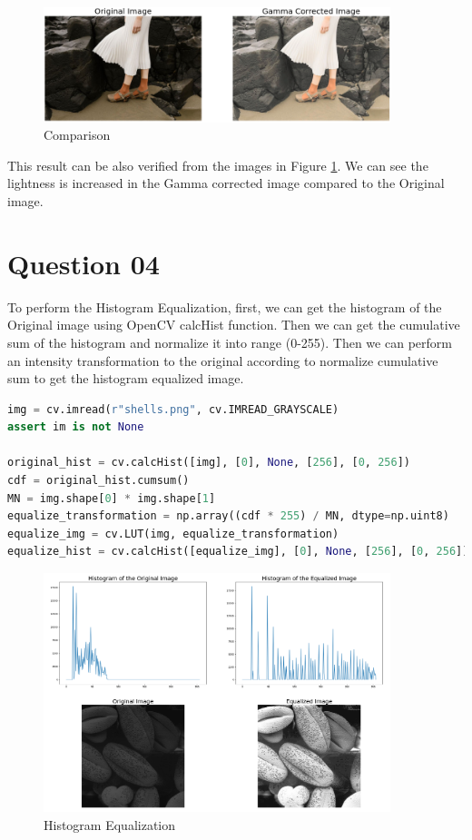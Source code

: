 \documentclass[a4paper]{article}
\begin{document}
\begin{figure}[!htb]
    \centering
    \includegraphics[width=0.9\textwidth]{../q32.png}

    \caption{Comparison}
    \label{figq32}
\end{figure}

This result can be also verified from the images in Figure \ref{figq32}.
 We can see the lightness is increased in the 
Gamma corrected image compared to the Original image.

\section*{Question 04}
To perform the Histogram Equalization, first, we can get the histogram of the
 Original image using OpenCV
calcHist function. Then we can get the cumulative sum of the histogram and
 normalize it into range (0-255). Then we can perform an intensity
  transformation to the original according to normalize cumulative sum to get the
  histogram equalized image.\\

\begin{lstlisting}[language=python, caption=Histogram Equalization]
img = cv.imread(r"shells.png", cv.IMREAD_GRAYSCALE)
assert im is not None

original_hist = cv.calcHist([img], [0], None, [256], [0, 256])
cdf = original_hist.cumsum()
MN = img.shape[0] * img.shape[1]
equalize_transformation = np.array((cdf * 255) / MN, dtype=np.uint8)
equalize_img = cv.LUT(img, equalize_transformation)
equalize_hist = cv.calcHist([equalize_img], [0], None, [256], [0, 256])
\end{lstlisting}

\begin{figure}[!htb]
    \centering

    \includegraphics[width=0.9\textwidth]{../q4.png}
    \caption{Histogram Equalization}
    \label{figq4}
\end{figure}
\end{document}
